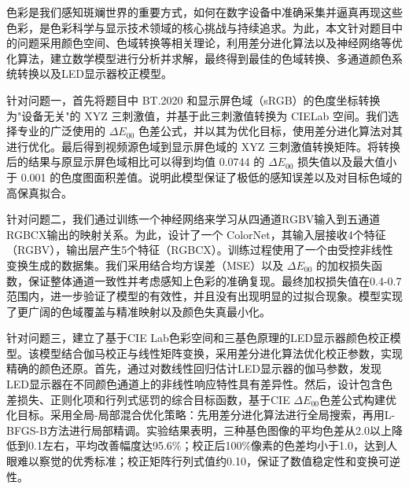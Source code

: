 \begin{cabstract}	%
色彩是我们感知斑斓世界的重要方式，如何在数字设备中准确采集并逼真再现这些色彩，是色彩科学与显示技术领域的核心挑战与持续追求。为此，本文针对题目中的问题采用颜色空间、色域转换等相关理论，利用差分进化算法以及神经网络等优化算法，建立数学模型进行分析并求解，最终得到最佳的色域转换、多通道颜色系统转换以及LED显示器校正模型。

针对问题一，首先将题目中 BT.2020 和显示屏色域（sRGB）的色度坐标转换为"设备无关"的 XYZ 三刺激值，并基于此三刺激值转换为 CIELab 空间。我们选择专业的广泛使用的 $\Delta E_{00}$ 色差公式，并以其为优化目标，使用差分进化算法对其进行优化。最后得到视频源色域到显示屏色域的 XYZ 三刺激值转换矩阵。将转换后的结果与原显示屏色域相比可以得到均值 0.0744 的 $\Delta E_{00}$ 损失值以及最大值小于 0.001 的色度图面积差值。说明此模型保证了极低的感知误差以及对目标色域的高保真拟合。

针对问题二，我们通过训练一个神经网络来学习从四通道RGBV输入到五通道RGBCX输出的映射关系。为此，设计了一个 ColorNet，其输入层接收4个特征（RGBV），输出层产生5个特征（RGBCX）。训练过程使用了一个由受控非线性变换生成的数据集。我们采用结合均方误差（MSE）以及 $\Delta E_{00}$ 的加权损失函数，保证整体通道一致性并考虑感知上色彩的准确复现。最终加权损失值在0.4-0.7范围内，进一步验证了模型的有效性，并且没有出现明显的过拟合现象。模型实现了更广阔的色域覆盖与精准映射以及颜色失真最小化。

针对问题三，建立了基于CIE Lab色彩空间和三基色原理的LED显示器颜色校正模型。该模型结合伽马校正与线性矩阵变换，采用差分进化算法优化校正参数，实现精确的颜色还原。首先，通过对数线性回归估计LED显示器的伽马参数，发现LED显示器在不同颜色通道上的非线性响应特性具有差异性。然后，设计包含色差损失、正则化项和行列式惩罚的综合目标函数，基于CIE $\Delta E_{00}$色差公式构建优化目标。采用全局-局部混合优化策略：先用差分进化算法进行全局搜索，再用L-BFGS-B方法进行局部精调。实验结果表明，三种基色图像的平均色差从2.0以上降低到0.1左右，平均改善幅度达95.6\%；校正后100\%像素的色差均小于1.0，达到人眼难以察觉的优秀标准；校正矩阵行列式值约0.10，保证了数值稳定性和变换可逆性。
\end{cabstract}

